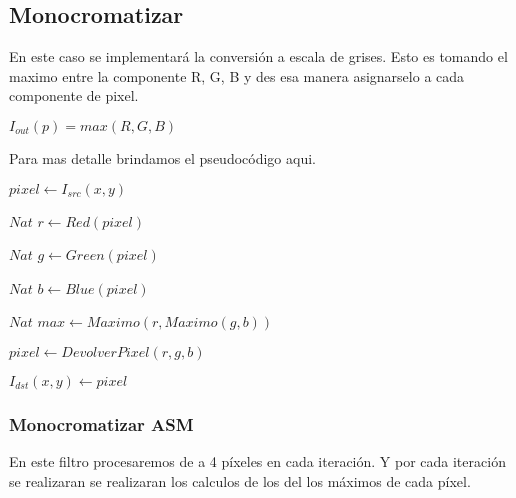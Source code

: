 \subsection{Monocromatizar}

En este caso se implementará la conversión a escala de grises. Esto es tomando el maximo entre la componente R, G, B y des esa manera asignarselo a cada componente de pixel.

\begin{center}
  $I_{out}(p) = max(R, G, B)$
\end{center}

Para mas detalle brindamos el pseudocódigo aqui. 

\begin{algorithm}[H]
  \begin{algorithmic}[1]
			  
			  \STATE $pixel \gets I_{src}(x,y)$
			  
			  \STATE $Nat$ $ r \gets Red(pixel) $
			  
			  \STATE $Nat$ $g \gets Green(pixel)$
			  
			  \STATE $Nat$ $ b \gets Blue(pixel)$
			  
			  \STATE $Nat$ $max \gets Maximo(r, Maximo(g, b))$
			  
			  \STATE $pixel \gets DevolverPixel(r,g,b)$
			
			  \STATE $I_{dst}(x,y) \gets pixel$
			  
			\ENDFOR

		 \ENDFOR

  \end{algorithmic}
  \caption{$monocromatizar (I_{src}, I_{dst})$}
  \label{alg:monocromatizar}
\end{algorithm}


\subsubsection*{Monocromatizar ASM}

En este filtro procesaremos de a 4 píxeles en cada iteración. %
Y por cada iteración se realizaran se realizaran los calculos de los del los máximos de cada píxel.


